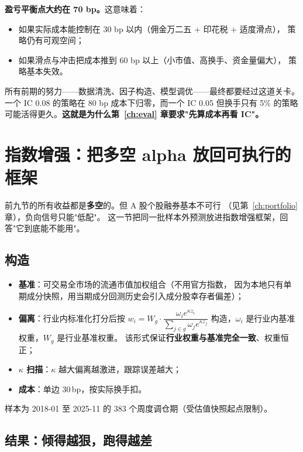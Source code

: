 \textbf{盈亏平衡点大约在 70 bp。}这意味着：

\begin{itemize}
  \item 如果实际成本能控制在 30 bp 以内（佣金万二五 + 印花税 + 适度滑点），
        策略仍有可观空间；
  \item 如果滑点与冲击把成本推到 60 bp 以上（小市值、高换手、资金量偏大），
        策略基本失效。
\end{itemize}

\begin{keybox}
所有前期的努力——数据清洗、因子构造、模型调优——最终都要经过这道关卡。
一个 IC 0.08 的策略在 80 bp 成本下归零，而一个 IC 0.05 但换手只有 5\% 的策略
可能活得更久。\textbf{这就是为什么第~\ref{ch:eval} 章要求"先算成本再看 IC"。}
\end{keybox}

\section{指数增强：把多空 alpha 放回可执行的框架}

前九节的所有收益都是\textbf{多空}的。但 A 股个股融券基本不可行
（见第~\ref{ch:portfolio} 章），负向信号只能"低配"。
这一节把同一批样本外预测放进指数增强框架，回答"它到底能不能用"。

\subsection{构造}

\begin{itemize}
  \item \textbf{基准}：可交易全市场的流通市值加权组合（不用官方指数，
        因为本地只有单期成分快照，用当期成分回测历史会引入成分股幸存者偏差）；
  \item \textbf{偏离}：行业内标准化打分后按
        $w_i = W_g \cdot \dfrac{\omega_i e^{\kappa z_i}}{\sum_{j\in g}\omega_j e^{\kappa z_j}}$
        构造，$\omega_i$ 是行业内基准权重，$W_g$ 是行业基准权重。
        该形式保证\textbf{行业权重与基准完全一致}、权重恒正；
  \item \textbf{$\kappa$ 扫描}：$\kappa$ 越大偏离越激进，跟踪误差越大；
  \item \textbf{成本}：单边 30\,bp，按实际换手扣。
\end{itemize}

样本为 2018-01 至 2025-11 的 383 个周度调仓期（受估值快照起点限制）。

\subsection{结果：倾得越狠，跑得越差}

